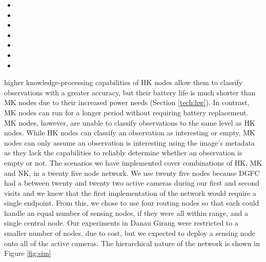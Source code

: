 	\begin{itemize}
		\item {}\item {}\item {}\item {}\item {}\item {}\item {}\end{itemize}

\DIFaddend higher knowledge-processing capabilities of HK nodes allow them to classify observations with a greater accuracy, but their battery life is much shorter than MK nodes due to their increased power needs (Section \ref{tech:hw}). In contrast, MK nodes can run for a longer period without requiring battery replacement. MK nodes, however, are unable to classify observations to the same level as HK nodes. While HK nodes can classify an observation as interesting or empty\DIFdelbegin {}\DIFdelend , MK nodes can only assume an observation is interesting using the image's metadata as they lack the capabilities to reliably determine whether an observation is empty or not. The scenarios we have implemented cover combinations of HK, MK and NK, in a twenty five node network. We use twenty five nodes because DGFC had a between twenty and twenty two active cameras during our first and second visits and we knew that the first implementation of the network would require a single endpoint. From this, we chose to use four routing nodes so that each could handle an equal number of sensing nodes, if they were all within range, and a single central node. Our experiments in Danau Girang were restricted to a smaller number of nodes, due to cost, but we expected to deploy a sensing node onto all of the active cameras. The hierarchical nature of the network is shown in Figure \ref{fig:sim}\DIFdelbegin {}\DIFdelend \DIFaddbegin {}\DIFaddend 

